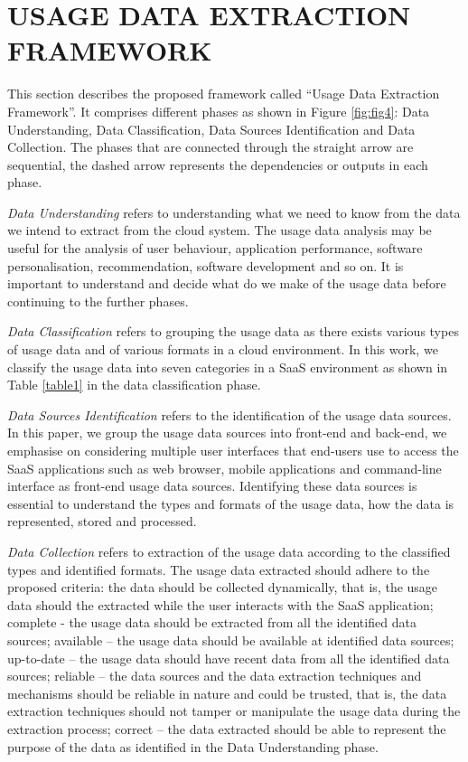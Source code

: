 \documentclass[a4paper,twoside]{article}
\begin{document}
\section{USAGE DATA EXTRACTION FRAMEWORK}
\label{sec:4 usage data extraction framework}

\noindent This section describes the proposed framework called “Usage Data Extraction Framework”. It comprises different phases as shown in Figure \ref{fig:fig4}: Data Understanding, Data Classification, Data Sources Identification and Data Collection. The phases that are connected through the straight arrow are sequential, the dashed arrow represents the dependencies or outputs in each phase.


\emph{Data Understanding} refers to understanding what we need to know from the data we intend to extract from the cloud system. The usage data analysis may be useful for the analysis of user behaviour, application performance, software personalisation, recommendation, software development and so on. It is important to understand and decide what do we make of the usage data before continuing to the further phases.

\emph{Data Classification} refers to grouping the usage data as there exists various types of usage data and of various formats in a cloud environment. In this work, we classify the usage data into seven categories in a SaaS environment as shown in Table \ref{table1} in the data classification phase. 

\emph{Data Sources Identification} refers to the identification of the usage data sources. In this paper, we group the usage data sources into front-end and back-end, we emphasise on considering multiple user interfaces that end-users use to access the SaaS applications such as web browser, mobile applications and command-line interface as front-end usage data sources. Identifying these data sources is essential to understand the types and formats of the usage data, how the data is represented, stored and processed. 

\emph{Data Collection} refers to extraction of the usage data according to the classified types and identified formats. The usage data extracted should adhere to the proposed criteria: the data should be collected dynamically, that is, the usage data should the extracted while the user interacts with the SaaS application; complete - the usage data should be extracted from all the identified data sources; available – the usage data should be available at identified data sources; up-to-date – the usage data should have recent data from all the identified data sources; reliable – the data sources and the data extraction techniques and mechanisms should be reliable in nature and could be trusted, that is, the data extraction techniques should not tamper or manipulate the usage data during the extraction process; correct – the data extracted should be able to represent the purpose of the data as identified in the Data Understanding phase.
\end{document}
